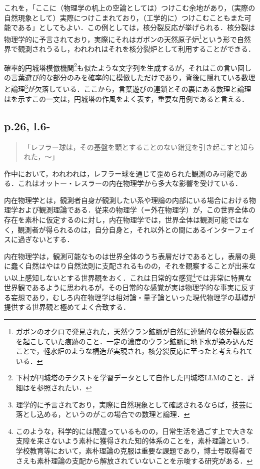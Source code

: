 \documentclass[10pt, a5paper, twoside]{jsarticle}
\theoremstyle{definition}
\begin{document}
                これを，「ここに（物理学の机上の空論としては）つけこむ余地があり，（実際の自然現象として）実際につけこまれており，（工学的に）つけこむこともまた可能である」としてもよい．この例としては，核分裂反応が挙げられる．核分裂は物理学的に予言されており，実際にそれはガボンの天然原子炉\footnote{ガボンのオクロで発見された，天然ウラン鉱脈が自然に連続的な核分裂反応を起こしていた痕跡のこと．一定の濃度のウラン鉱脈に地下水が染み込んだことで，軽水炉のような構造が実現され，核分裂反応に至ったと考えられている．}という形で自然界で観測されうるし，われわれはそれを核分裂炉として利用することができる．

                確率的円城塔模倣機関\footnote{下村が円城塔のテクストを学習データとして自作した円城塔LLMのこと．詳細は\cite{llm}を参照されたい．}も似たような文字列を生成するが，それはこの言い回しの言葉遊び的な部分のみを確率的に模倣しただけであり，背後に隠れている数理と論理\footnote{理学的に予言されており，実際に自然現象として確認されるならば，技芸に落とし込める，というのがこの場合での数理と論理．}が欠落している．ここから，言葉遊びの連鎖とその裏にある数理と論理はを示すこの一文は，円城塔の作風をよく表す，重要な用例であると言える．

            \subsection{p.26, l.6-}

                \begin{quote}

                    「レフラー球は，その基盤を顕とすることのない錯覚を引き起こすと知られた，〜」

                \end{quote}

                作中において，われわれは，レフラー球を通じて歪められた観測のみ可能である．これはオットー・レスラーの内在物理学から多大な影響を受けている．


                内在物理学とは，観測者自身が観測したい系や理論の内部にいる場合における物理学および観測理論である．従来の物理学（＝外在物理学）が，この世界全体の存在を素朴に仮定するのに対し，内在物理学では，世界全体は観測可能ではなく，観測者が得られるのは，自分自身と，それ以外との間にあるインターフェイスに過ぎないとする\cite{ott}．

                内在物理学は，観測可能なものは世界全体のうち表層だけであるとし，表層の奥に蠢く自然はやはり自然法則に支配されるものの，それを観察することが出来ない以上感知しないとする世界観をおく．これは日常的な感覚\footnote{このような，科学的には間違っているものの，日常生活を過ごす上で大きな支障を来さないよう素朴に獲得された知的体系のことを，素朴理論という．学校教育等において，素朴理論の克服は重要な課題であり，博士号取得者でさえも素朴理論の支配から解放されていないことを示唆する研究\cite{cog}がある．}では非常に特異な世界観であるように思われるが，その日常的な感覚が実は物理学的な事実に反する妄想であり，むしろ内在物理学は相対論・量子論といった現代物理学の基礎が提供する世界観と極めてよく合致する．
\end{document}
